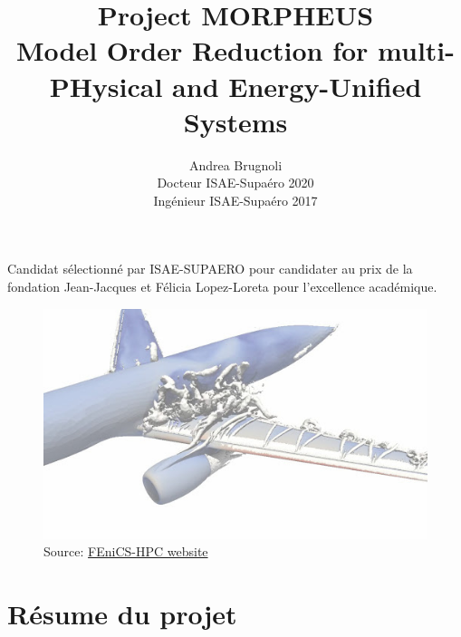 \documentclass[12pt, french]{article}
\author{Andrea Brugnoli \\ 
	\hspace{2.8pt} Docteur ISAE-Supaéro 2020\\
	Ingénieur ISAE-Supaéro 2017}
\title{Project MORPHEUS \\
	\vspace{.3cm}
	\Large{Model Order Reduction for multi-PHysical and Energy-Unified Systems}  }
\date{}
\begin{document}
	
	\maketitle
	
	\large{\noindent Candidat sélectionné par ISAE-SUPAERO pour candidater au prix de la fondation Jean-Jacques et Félicia Lopez-Loreta pour l'excellence académique. }

	
	
	\begin{figure}[h]
		\centering
		\includegraphics[width=.95\textwidth]{3Dplane.jpg}
		\captionsetup{labelformat=empty}
		\caption{Source: \href{http://www.fenics-hpc.org/}{FEniCS-HPC website}}
	\end{figure}
	
	
	
	
	
	\thispagestyle{empty}
	
	\newpage
	
	\section{Résume du projet}
	
\end{document}

